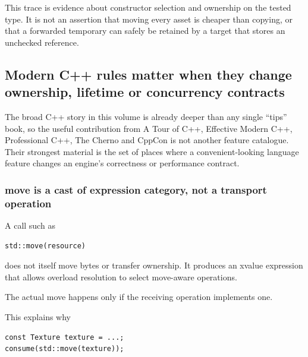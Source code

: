 This trace is evidence about constructor selection and ownership on the tested type. It is not an assertion that moving every asset is cheaper than copying, or that a forwarded temporary can safely be retained by a target that stores an unchecked reference.

\subsection{Modern C++ rules matter when they change ownership, lifetime or concurrency contracts}\label{01-foundations-i-ch005-modern-c-rules-matter-when-they-change-ownership-lifetime-or-concurrency-contracts}

\hypertarget{01-foundations-i-ch005-modern-c-rules-matter-when-they-change-ownership-lifetime-or-concurrency-contracts}{}

The broad C++ story in this volume is already deeper than any single ``tips'' book, so the useful contribution from A Tour of C++, Effective Modern C++, Professional C++, The Cherno and CppCon is not another feature catalogue. Their strongest material is the set of places where a convenient-looking language feature changes an engine's correctness or performance contract.

\subsubsection{move is a cast of expression category, not a transport operation}\label{01-foundations-i-ch005-move-is-a-cast-of-expression-category-not-a-transport-operation}

\hypertarget{01-foundations-i-ch005-move-is-a-cast-of-expression-category-not-a-transport-operation}{}

A call such as

\begin{verbatim}
std::move(resource)
\end{verbatim}

does not itself move bytes or transfer ownership. It produces an xvalue expression that allows overload resolution to select move-aware operations.

The actual move happens only if the receiving operation implements one.

This explains why

\begin{verbatim}
const Texture texture = ...;
consume(std::move(texture));
\end{verbatim}

